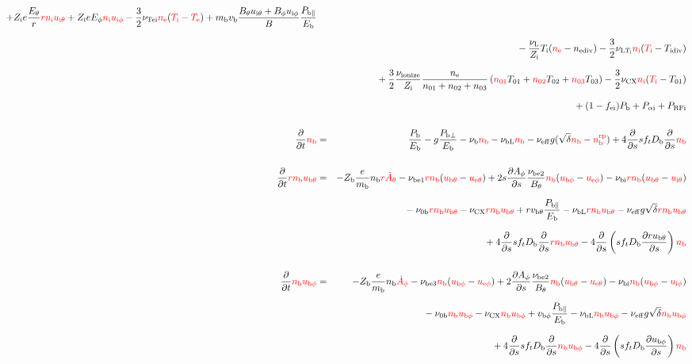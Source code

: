 \documentclass[11pt]{article}
\def\r#1{{\rm#1}}
\def\ddt{\frac{\partial}{\partial t}}
\def\dds{\frac{\partial}{\partial s}}
\def\dd#1{\frac{\partial #1}{\partial s}}
\def\mb{m_\r{b}}
\def\nee{n_\r{e}}
\def\ni{n_\r{i}}
\def\nb{n_\r{b}}
\def\ueth{u_{\r{e}\theta}}
\def\uith{u_{\r{i}\theta}}
\def\ubth{u_{\r{b}\theta}}
\def\ueph{u_{\r{e}\phi}}
\def\uiph{u_{\r{i}\phi}}
\def\ubph{u_{\r{b}\phi}}
\def\Eth{E_\theta}
\def\Eph{E_\phi}
\def\Bth{B_\theta}
\def\Bph{B_\phi}
\def\Athd{\dot{A}_\theta}
\def\Aphd{\dot{A}_\phi}
\def\Aph{A_\phi}
\def\Te{T_\r{e}}
\def\Ti{T_\r{i}}
\def\nna{n_{01}}
\def\nnb{n_{02}}
\def\nnc{n_{03}}
\def\Zi{Z_\r{i}}
\def\Zb{Z_\r{b}}
\def\Pb{P_\r{b}}
\def\Eb{E_\r{b}}
\def\PRFi{P_\r{RFi}}
\def\Tna{T_{01}}
\def\Tnb{T_{02}}
\def\Tnc{T_{03}}
\def\fei{f_\r{ei}}
\def\nbrp{n_\r{b}^\r{rp}}
\def\Pbpara{P_{\r{b}\parallel}}
\def\Pbperp{P_{\r{b}\perp}}
\def\nueff{\nu_\r{eff}}
\def\Db{D_\r{b}}
\def\Palpi{P_{\alpha\r{i}}}
\def\nuNCi{\nu_\r{NCi}}
\def\nubi{\nu_\r{bi}}
\def\nunb{\nu_\r{0b}}
\def\nuL{\nu_\r{L}}
\def\nuCX{\nu_\r{CX}}
\def\nuion{\nu_\r{ionize}}
\def\nub{\nu_\r{b}}
\def\nuTei{\nu_\r{Tei}}
\def\vb{v_\r{b}}
\def\nediv{n_\r{ediv}}
\def\Tidiv{T_\r{idiv}}
\def\nuLTi{\nu_{\r{L}T_\r{i}}}
\def\nubL{\nu_\r{bL}}
\def\vbph{v_{\r{b}\phi}}
\def\vbth{v_{\r{b}\theta}}
\def\red#1{\textcolor{red}{#1}}
\begin{document}
\begin{eqnarray}
%
  + \Zi e \frac{\Eth}{r} \red{r \ni \uith}
%
  + \Zi e \Eph \red{\ni \uiph}
%
  - \frac{3}{2} \nuTei \red{\nee} (\red{\Ti} - \red{\Te})
%
  + \mb \vb \frac{\Bth \uith + \Bph \uiph}{B} \frac{\Pbpara}{\Eb}  
\nonumber\\[2.5mm]&&{}
%
  - \frac{\nuL}{\Zi} \Ti (\red{\nee} - \nediv)
%
  - \frac{3}{2} \nuLTi \red{\ni} (\red{\Ti} - \Tidiv)
\nonumber\\[2.5mm]&&{}
%
  + \frac{3}{2} \frac{\nuion}{\Zi} \frac{\nee}{\nna + \nnb + \nnc}\, (\red{\nna} \Tna +
  \red{\nnb} \Tnb + \red{\nnc} \Tnc)
%
  - \frac{3}{2} \nuCX \red{\ni} (\red{\Ti} - \Tna)
\nonumber\\[2.5mm]&&{}
%
  + (1 - \fei) \Pb
%
  + \Palpi
%
  + \PRFi
\\[5mm]
  \ddt \red{\nb} &=&
%
    \frac{\Pb}{\Eb}
%
  - g \frac{\Pbperp}{\Eb}
%
  - \nub \red{\nb}
%
  - \nubL \red{\nb}
%
  - \nueff g (\sqrt{\delta}\red{\nb} - \red{\nbrp})
%
  + 4 \dds s f_t \Db \dds \red{\nb}
\\[5mm]
  \ddt \red{r \nb \ubth} &=&
%
  - \Zb \frac{e}{\mb} \nb \red{r \Athd}
%
%
  - \nu_\r{be1} \red{r \nb} (\red{\ubth} - \red{\ueth})
%
  + 2 s \dd{\Aph} \frac{\nu_\r{be2}}{\Bth} \red{\nb} (\red{\ubph} - \red{\ueph})
%
  - \nubi \red{r \nb} (\red{\ubth} - \red{\uith})
\nonumber\\[2.5mm]&&{}
%
  - \nunb \red{r \nb \ubth}
%
  - \nuCX \red{r \nb \ubth}
%
  + r \vbth \frac{\Pbpara}{\Eb}
%
  - \nubL \red{r \nb \ubth}
%
  - \nueff g \sqrt{\delta} \red{r \nb \ubth}
\nonumber\\[2.5mm]&&{}
%
  + 4 \dds s f_t \Db \dds \red{r \nb \ubth}
%
  - 4 \dds \left( s f_t \Db \dd{r\ubth} \right) \red{\nb}
\\[5mm]
  \ddt \red{\nb \ubph} &=&
%
  - \Zb \frac{e}{\mb} \nb \red{\Aphd}
%
  - \nu_\r{be3} \red{\nb} (\red{\ubph} - \red{\ueph})
%
  + 2 \dd{\Aph} \frac{\nu_\r{be2}}{\Bth} \red{\nb} (\red{\ubth} - \red{\ueth})
%
  - \nubi \red{\nb} (\red{\ubph} - \red{\uiph})
\nonumber\\[2.5mm]&&{}
%
  - \nunb \red{\nb \ubph}
%
  - \nuCX \red{\nb \ubph}
%
  + \vbph \frac{\Pbpara}{\Eb}
%
  - \nubL \red{\nb \ubph}
%
  - \nueff g \sqrt{\delta} \red{\nb \ubph}
\nonumber\\[2.5mm]&&{}
%
  + 4 \dds s f_t \Db \dds \red{\nb \ubph}
%
  - 4 \dds \left( s f_t \Db \dd{\ubph} \right) \red{\nb}
\\[5mm]

\end{eqnarray}
\end{document}
